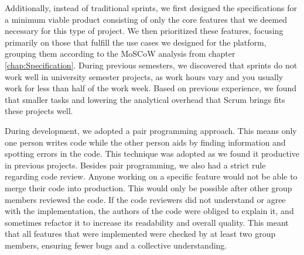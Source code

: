 Additionally, instead of traditional sprints, we first designed the specifications for a minimum viable product consisting of only the core features that we deemed necessary for this type of project.
We then prioritized these features, focusing primarily on those that fulfill the use cases we designed for the platform, grouping them according to the MoSCoW analysis from chapter \ref{chap:Specification}.
During previous semesters, we discovered that sprints do not work well in university semester projects, as work hours vary and you usually work for less than half of the work week.
Based on previous experience, we found that smaller tasks and lowering the analytical overhead that Scrum brings fits these projects well.

During development, we adopted a pair programming approach. This means only one person writes code while the other person aids by finding information and spotting errors in the code. This technique was adopted as we found it productive in previous projects.
Besides pair programming, we also had a strict rule regarding code review. Anyone working on a specific feature would not be able to merge their code into production. This would only be possible after other group members reviewed the code.
If the code reviewers did not understand or agree with the implementation, the authors of the code were obliged to explain it, and sometimes refactor it to increase its readability and overall quality.
This meant that all features that were implemented were checked by at least two group members, ensuring fewer bugs and a collective understanding.



